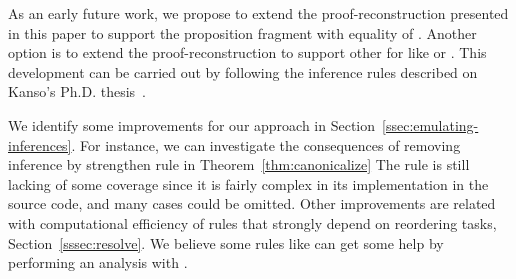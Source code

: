 \documentclass[../main.tex]{subfiles}
\begin{document}
As an early future work, we propose to extend the
proof-reconstruction presented in this paper to support the
proposition fragment with equality of \Metis.
Another option is to extend the proof-reconstruction to support other \ATPs for \CPL like  or .
This development can be carried out by following the 
inference rules described on Kanso's Ph.D. thesis~\cite{Kanso2012}.

We identify some improvements for our approach in
Section~\ref{ssec:emulating-inferences}.
For instance, we can investigate the consequences of removing \clausify
inference by strengthen \canonicalize rule in Theorem~\ref{thm:canonicalize}
The \simplify rule is still lacking of some coverage since it is fairly
complex in its implementation in the \Metis source code,
and many cases could be omitted.
Other improvements are related with computational efficiency of
rules that strongly depend on reordering tasks,
Section~\ref{sssec:resolve}.
We believe some rules like \canonicalize can get some help by
performing an analysis with \Athena.
\end{document}
